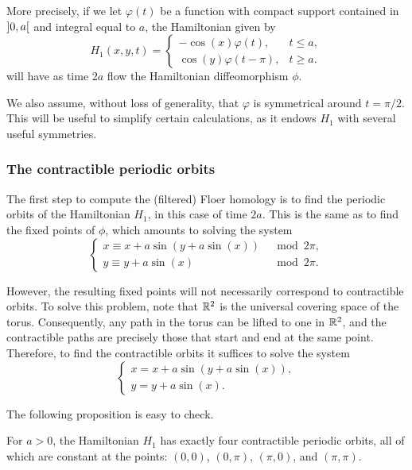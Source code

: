 More precisely, if we let $\varphi(t)$ be a function with compact support contained in $\ointerval 0 a$ and integral equal to $a$, the Hamiltonian given by
\begin{equation}
\label{h1def}
H_1(x,y,t) = \begin{cases}
-\cos(x) \varphi(t), & t \leq a,\\
\cos(y) \varphi(t-\pi), & t \geq a.
\end{cases}
\end{equation}
will have as time $2a$ flow the Hamiltonian diffeomorphism $\phi$.

We also assume, without loss of generality, that $\varphi$ is symmetrical around $t = \pi/2$. This will be useful to simplify certain calculations, as it endows $H_1$ with several useful symmetries.

\subsubsection{The contractible periodic orbits}

The first step to compute the (filtered) Floer homology is to find the periodic orbits of the Hamiltonian $H_1$, in this case of time $2a$. This is the same as to find the fixed points of $\phi$, which amounts to solving the system
\begin{equation}
\begin{cases}
x \equiv x + a \sin(y + a \sin(x)) &\mod 2\pi,\\
y \equiv y + a \sin(x) &\mod 2\pi.
\end{cases}
\end{equation}

However, the resulting fixed points will not necessarily correspond to contractible orbits. To solve this problem, note that $\mathbb{R}^2$ is the universal covering space of the torus. Consequently, any path in the torus can be lifted to one in $\mathbb{R}^2$, and the contractible paths are precisely those that start and end at the same point. Therefore, to find the contractible orbits it suffices to solve the system
\begin{equation}
\begin{cases}
x = x + a \sin(y + a \sin(x)),\\
y = y + a \sin(x).
\end{cases}
\end{equation}

The following proposition is easy to check.

\begin{prop}
For $a > 0$, the Hamiltonian $H_1$ has exactly four contractible periodic orbits, all of which are constant at the points: $(0,0)$, $(0,\pi)$, $(\pi,0)$, and $(\pi,\pi)$.
\end{prop}

